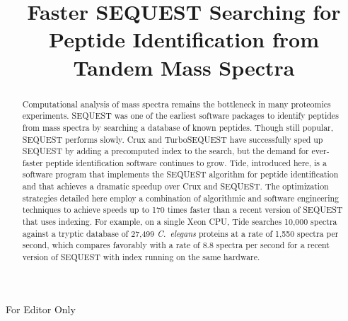 



\title{Faster SEQUEST Searching for Peptide
  Identification from Tandem Mass Spectra}
\RequirePackage[normalem]{ulem} %
\RequirePackage{color} %
\providecommand{\DIFadd}[1]{{\protect\color{blue}\uwave{#1}}} %
\providecommand{\DIFdel}[1]{{\protect\color{red}\sout{#1}}}                      %
\providecommand{\DIFaddbegin}{} %
\providecommand{\DIFaddend}{} %
\providecommand{\DIFdelbegin}{} %
\providecommand{\DIFdelend}{} %
\providecommand{\DIFaddFL}[1]{\DIFadd{#1}} %
\providecommand{\DIFdelFL}[1]{\DIFdel{#1}} %
\providecommand{\DIFaddbeginFL}{} %
\providecommand{\DIFaddendFL}{} %
\providecommand{\DIFdelbeginFL}{} %
\providecommand{\DIFdelendFL}{} %



\begin{center}
{\protect\color{red}\huge{For Editor Only}}
\end{center}

\maketitle

\begin{abstract}

Computational analysis of mass spectra remains the bottleneck in many
proteomics experiments. SEQUEST was one of the earliest software
packages to identify peptides from mass spectra by searching a
database of known peptides. Though still popular, SEQUEST performs
slowly. Crux and TurboSEQUEST have successfully sped up SEQUEST by
adding a precomputed index to the search, but the demand for
ever-faster peptide identification software continues to grow. Tide,
introduced here, is a software program that implements the SEQUEST
algorithm for peptide identification and that achieves a dramatic
speedup over Crux and SEQUEST.  The optimization strategies detailed
here employ a combination of algorithmic and software engineering
techniques to achieve speeds up to 170 times faster than a recent
version of SEQUEST that uses indexing.  For example, on a single Xeon
CPU, Tide searches 10,000 spectra against a tryptic database of 27,499
{\it C.\ elegans} proteins at a rate of 1,550 spectra per second,
which compares favorably with a rate of 8.8 spectra per second for a
recent version of SEQUEST with index running on the same hardware.

\end{abstract}

